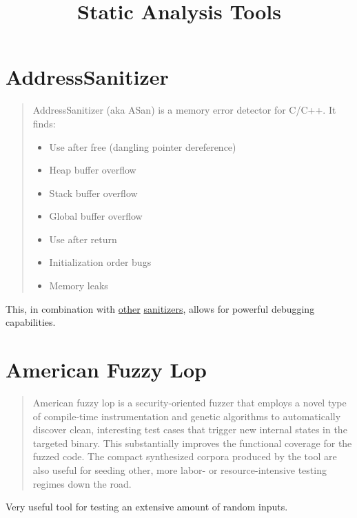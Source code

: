 \documentclass[12pt]{article}
\author{}
\date{}
\title{\Huge\bfseries Static Analysis Tools}
\begin{document}
\maketitle
\tableofcontents
\section{AddressSanitizer}
\begin{quote}
AddressSanitizer (aka ASan) is a memory error detector for C/C++. It finds:

\begin{itemize}
    \item Use after free (dangling pointer dereference)
    \item Heap buffer overflow
    \item Stack buffer overflow
    \item Global buffer overflow
    \item Use after return
    \item Initialization order bugs
    \item Memory leaks
\end{itemize}
\end{quote}

\label{asan}
This, in combination with \hyperref[msan]{other} \hyperref[tsan]{sanitizers},
allows for powerful debugging capabilities.
\cite{asan}
\section{American Fuzzy Lop}
\begin{quote}
American fuzzy lop is a security-oriented fuzzer that employs a
novel type of compile-time instrumentation and genetic algorithms to
automatically discover clean, interesting test cases that trigger new
internal states in the targeted binary. This substantially improves
the functional coverage for the fuzzed code. The compact synthesized
corpora produced by the tool are also useful for seeding other,
more labor- or resource-intensive testing regimes down the road.
\end{quote}

Very useful tool for testing an extensive amount of random inputs.
\cite{afl}
\end{document}
